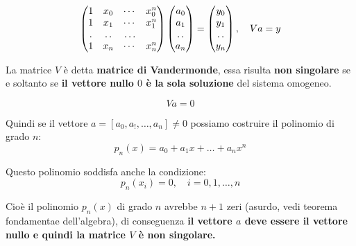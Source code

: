 \begin{equation}
  \begin{array}{c}
    \begin{pmatrix}
      1 & x_0 & \cdots & x_0^n \\ 
      1 & x_1 & \cdots & x_1^n \\ 
      \dotfill & \dotfill & \dotfill \\
      1 & x_n & \cdots & x_n^n 
    \end{pmatrix}

    \begin{pmatrix}
      a_0 \\
      a_1 \\
      \dotfill \\
      a_n
    \end{pmatrix}

    =

    \begin{pmatrix}
      y_0 \\
      y_1 \\
      \dotfill \\
      y_n
    \end{pmatrix}

    ,

    \quad Va = y


  \end{array}
\end{equation}

La matrice $V$ è detta \textbf{matrice di Vandermonde}, essa risulta \textbf{non singolare} se e soltanto se 
\textbf{il vettore nullo $0$ è la sola soluzione} del sistema omogeneo.

\begin{equation}
  Va = 0
\end{equation}

Quindi se il vettore $a = [a_0, a_!, \dots, a_n] \neq 0$ possiamo costruire il polinomio di grado $n$:
\begin{equation}
 p_n(x) = a_0 + a_1x + \dots + a_nx^n
\end{equation}

Questo polinomio soddisfa anche la condizione:
\begin{equation}
 p_n(x_i) = 0, \quad i = 0, 1, \dots, n
\end{equation}

Cioè il polinomio $p_n(x)$ di grado $n$ avrebbe $n + 1$ zeri (asurdo, vedi teorema fondamentae dell'algebra), di conseguenza
\textbf{il vettore $a$ deve essere il vettore nullo e quindi la matrice $V$ è non singolare.}

